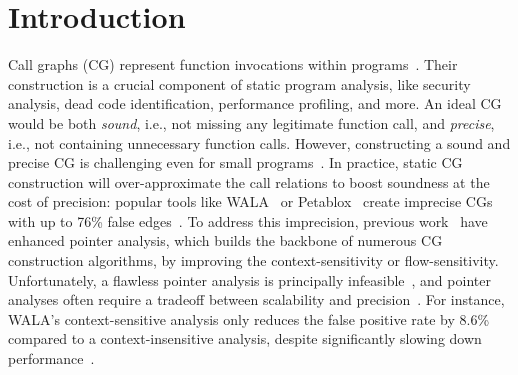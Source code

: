 \newpage

\section{Introduction}
Call graphs (CG) represent function invocations within programs~\cite{ryder1979constructing, callahan1990constructing}.
Their construction is a crucial component of static program analysis, like security analysis, dead code identification, performance profiling, and more.
An ideal CG would be both \emph{sound}, i.e., not missing any legitimate function call, and \emph{precise}, i.e., not containing unnecessary function calls.
However, constructing a sound and precise CG is challenging even for small programs~\cite{ali2012application}.
In practice, static CG construction will over-approximate the call relations to boost soundness at the cost of precision: popular tools like WALA~\cite{fink2012wala} or Petablox~\cite{mangal2015user} create imprecise CGs with up to 76\% false edges~\cite{utture2022striking}.
To address this imprecision, previous work~\cite{bravenboer2009strictly, mangal2015user, tan2016making} have enhanced pointer analysis, which builds the backbone of numerous CG construction algorithms, by improving the context-sensitivity or flow-sensitivity.
Unfortunately, a flawless pointer analysis is principally infeasible~\cite{rice1953classes}, and pointer analyses often require a tradeoff between scalability and precision~\cite{li2018scalability}.
For instance, WALA's context-sensitive analysis only reduces the false positive rate by 8.6\% compared to a context-insensitive analysis, despite significantly slowing down performance~\cite{utture2022striking}.

